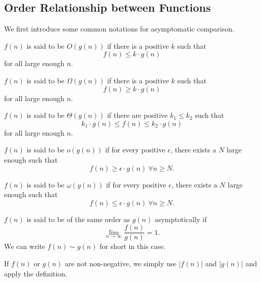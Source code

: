 \subsection{Order Relationship between Functions}
We first introduce some common notations for asymptomatic comparison.
\begin{definition}
	\(f(n)\) is said to be \(O(g(n))\) if there is a positive \(k\) such that
	\[
		f(n)\leq k\cdot g(n)
	\]
	for all large enough \(n\).
\end{definition}

\begin{definition}
	\(f(n)\) is said to be \(\Omega(g(n))\) if there is a positive \(k\) such that
	\[
		f(n) \geq k\cdot g(n)
	\]
	for all large enough \(n\).
\end{definition}

\begin{definition}
	\(f(n)\) is said to be \(\Theta(g(n))\) if there are positive \(k_1\leq k_2\) such that
	\[
		k_1\cdot g(n)\leq f(n) \leq k_2\cdot g(n)
	\]
	for all large enough \(n\).
\end{definition}

\begin{definition}
	\(f(n)\) is said to be \(o(g(n))\) if for every positive \(\epsilon\), there exists a \(N\) large enough such that
	\[
		f(n) \geq \epsilon\cdot g(n)\ \forall n\geq N.
	\]
\end{definition}

\begin{definition}
	\(f(n)\) is said to be \(\omega(g(n))\) if for every positive \(\epsilon\), there exists a \(N\) large enough such that
	\[
		f(n) \leq \epsilon\cdot g(n)\ \forall n\geq N.
	\]
\end{definition}

\begin{definition}
	\(f(n)\) is said to be of the same order as \(g(n)\) asymptotically if
	\[
		\lim_{n\to \infty } \frac{f(n)}{g(n)} = 1.
	\]
	We can write \(f(n)\sim g(n)\) for short in this case.
\end{definition}

\begin{remark}
	If \(f(n)\) or \(g(n)\) are not non-negative, we simply use \(\left\vert f(n) \right\vert \) and \(\left\vert g(n) \right\vert \)
	and apply the definition.
\end{remark}

